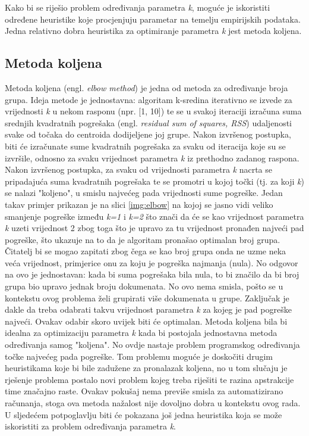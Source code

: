 \documentclass[times, utf8, zavrsni]{fer}
\begin{document}
Kako bi se riješio problem određivanja parametra \textit{k}, moguće je iskoristiti određene heuristike koje procjenjuju parametar na temelju empirijskih podataka. Jedna relativno dobra heuristika za optimiranje parametra \textit{k} jest metoda koljena.

\subsection{Metoda koljena}
Metoda koljena (engl. \textit{elbow method}) je jedna od metoda za određivanje broja grupa. Ideja metode je jednostavna: algoritam k-sredina iterativno se izvede za vrijednosti \textit{k} u nekom rasponu (npr. [1, 10]) te se u svakoj iteraciji izračuna suma srednjih kvadratnih pogrešaka (engl. \textit{residual sum of squares, RSS}) udaljenosti svake od točaka do centroida dodijeljene joj grupe. Nakon izvršenog postupka, biti će izračunate sume kvadratnih pogrešaka za svaku od iteracija koje su se izvršile, odnosno za svaku vrijednost parametra \textit{k} iz prethodno zadanog raspona. Nakon izvršenog postupka, za svaku od vrijednosti parametra \textit{k} nacrta se pripadajuća suma kvadratnih pogrešaka te se promotri u kojoj točki (tj. za koji \textit{k}) se nalazi "koljeno", u smislu najvećeg pada vrijednosti sume pogreške. Jedan takav primjer prikazan je na slici \ref{img:elbow} na kojoj se jasno vidi veliko smanjenje pogreške između \textit{k=1} i \textit{k=2} što znači da će se kao vrijednost parametra \textit{k} uzeti vrijednost 2 zbog toga što je upravo za tu vrijednost pronađen najveći pad pogreške, što ukazuje na to da je algoritam pronašao optimalan broj grupa. Čitatelj bi se mogao zapitati zbog čega se kao broj grupa onda ne uzme neka veća vrijednost, primjerice onu za koju je pogreška najmanja (nula). No odgovor na ovo je jednostavan: kada bi suma pogrešaka bila nula, to bi značilo da bi broj grupa bio upravo jednak broju dokumenata. No ovo nema smisla, pošto se u kontekstu ovog problema želi grupirati više dokumenata u grupe. Zaključak je dakle da treba odabrati takvu vrijednost parametra \textit{k} za kojeg je pad pogreške najveći. Ovakav odabir skoro uvijek biti će optimalan.
Metoda koljena bila bi idealna za optimizaciju parametra \textit{k} kada bi postojala jednostavna metoda određivanja samog "koljena". No ovdje nastaje problem programskog određivanja točke najvećeg pada pogreške. Tom problemu moguće je doskočiti drugim heuristikama koje bi bile zadužene za pronalazak koljena, no u tom slučaju je rješenje problema postalo novi problem kojeg treba riješiti te razina apstrakcije time značajno raste. Ovakav pokušaj nema previše smisla za automatizirano računanja, stoga ova metoda nažalost nije dovoljno dobra u kontekstu ovog rada. U sljedećem potpoglavlju biti će pokazana još jedna heuristika koja se može iskoristiti za problem određivanja parametra \textit{k}.
\end{document}
